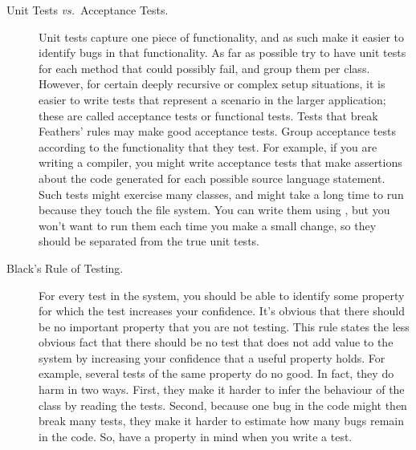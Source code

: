 \documentclass[a4paper,10pt,twoside]{book}
\begin{document}
\begin{description}
\item[Unit Tests \textit{vs.}\ Acceptance Tests.] Unit tests capture one piece of
  functionality, and as such make it easier to identify bugs in that functionality.
  As far as
  possible try to have unit tests for each method that could possibly fail, and group them per class.
  However,
  for certain deeply recursive or complex setup situations, it is
  easier to write tests that represent a scenario in the larger application; these are called acceptance 
  tests or functional tests.
  Tests that break Feathers' rules may make good acceptance tests.
  Group acceptance tests according to the functionality that they test.
  For example, if you are writing a compiler, you might write acceptance tests that make 
  assertions about the code generated for each possible source language statement.
  Such tests might exercise many classes, and might take a long time to run because they touch the 
  file system.
  You can write them using \sunit, but you won't want to run them each time you make a small change,
  so they should be separated from the true unit tests.
 
\item[Black's Rule of Testing.]
  For every test in the system, you should be able to identify some property for which
  the test increases your confidence.
  It's obvious that there should be no important property that you are not testing.
  This rule states the less obvious fact that there should be
  no test that does not add value to the system by increasing your confidence that a useful property
  holds.
  For example, several tests of the same property do no good. 
  In fact, they do harm in two ways.
  First, they make it harder to infer the behaviour of the class by reading the tests. 
  Second, 
  because one bug in the code might then break many tests, they make it harder to estimate how many bugs remain in the code.
  So, have a property in mind when you write a test.
\end{description}


\end{document}
